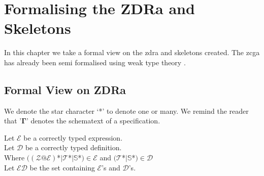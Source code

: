 \chapter{Formalising the ZDRa and Skeletons}
\label{ch:formal}

In this chapter we take a formal view on the \gls{zdra} and skeletons created. The \gls{zcga} has already been semi formalised using weak type theory \cite{wtt}. 

\section{Formal View on ZDRa}
We denote the star character `*' to denote one or many. We remind the reader that '$\mathbf{\Gamma}$' denotes the schematext of a specification.

\begin{defin}
Let $\mathcal{E}$ be a correctly typed expression. \\ Let $\mathcal{D}$ be a correctly typed definition. \\
Where $((\mathcal{Z}@\mathcal{E})$*$|\mathcal{T}$*$|\mathbb{S}$*$) \in \mathcal{E}$ and $(\mathcal{T}$*$|\mathbb{S}$*$) \in \mathcal{D}$\\
Let $\mathcal{ED}$ be the set containing $\mathcal{E}$'s and $\mathcal{D}$'s.
\end{defin}


